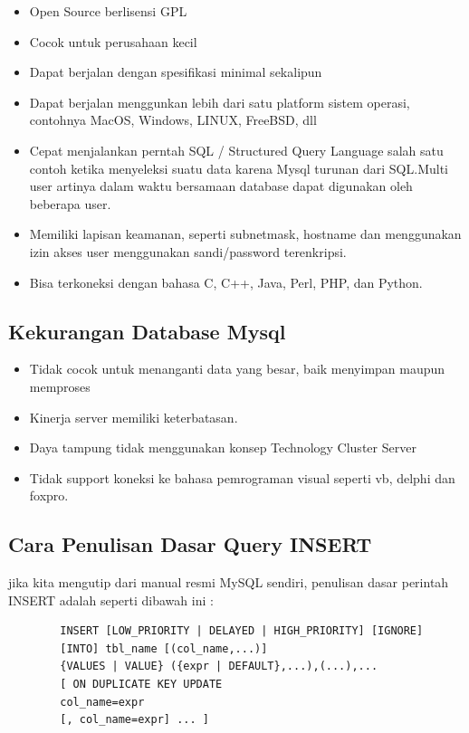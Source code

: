 	\begin{itemize}
		\item Open Source berlisensi GPL
		\item Cocok untuk perusahaan kecil
		\item Dapat berjalan dengan spesifikasi minimal sekalipun
		\item Dapat berjalan menggunkan lebih dari satu platform sistem operasi, contohnya MacOS, Windows, LINUX, FreeBSD, dll
		\item Cepat menjalankan perntah SQL / Structured Query Language salah satu contoh ketika menyeleksi suatu data karena Mysql turunan dari SQL.Multi user artinya dalam waktu bersamaan database dapat digunakan oleh beberapa user.
		\item Memiliki lapisan keamanan, seperti subnetmask, hostname dan menggunakan izin akses user menggunakan sandi/password terenkripsi.
		\item Bisa terkoneksi dengan bahasa C, C++, Java, Perl, PHP, dan Python.
	\end{itemize}
	
	\subsection{Kekurangan Database Mysql}
	
	\begin{itemize}
		\item Tidak cocok untuk menanganti data yang besar, baik menyimpan maupun memproses
		\item Kinerja server memiliki keterbatasan.
		\item Daya tampung tidak menggunakan konsep Technology Cluster Server
		\item Tidak support koneksi ke bahasa pemrograman visual seperti vb, delphi dan foxpro.
	\end{itemize}
	
	\subsection{Cara Penulisan Dasar Query INSERT}
	
	jika kita mengutip dari manual resmi MySQL sendiri, penulisan dasar perintah INSERT adalah seperti dibawah ini :
	
	\begin{verbatim}
		INSERT [LOW_PRIORITY | DELAYED | HIGH_PRIORITY] [IGNORE]
		[INTO] tbl_name [(col_name,...)]
		{VALUES | VALUE} ({expr | DEFAULT},...),(...),...
		[ ON DUPLICATE KEY UPDATE
		col_name=expr
		[, col_name=expr] ... ]
	\end{verbatim}
	

